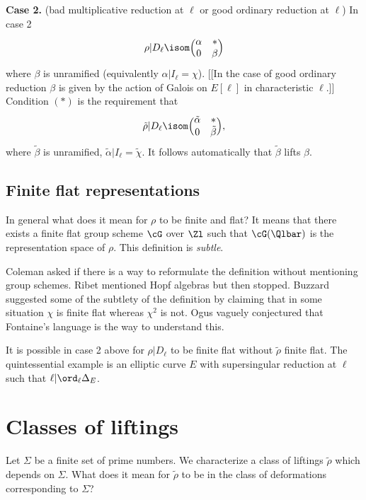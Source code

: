 \documentclass{report}
\begin{document}
{\bfseries Case 2.} (bad multiplicative reduction at $\ell$ or good
ordinary reduction at $\ell$) In case 2
$$\rho|D_{\ell}\isom
    \Bigl(\begin{matrix}\alpha&*\\0&\beta\end{matrix}\Bigr)$$
where $\beta$ is unramified (equivalently $\alpha|I_{\ell}=\chi$).
[[In the case of good ordinary reduction $\beta$ is given by the action
of Galois on $E[\ell]$ in characteristic $\ell$.]]
Condition $(*)$ is the requirement that
$$\tilde{\rho}|D_{\ell}\isom
    \Bigl(\begin{matrix}\tilde{\alpha}&*\\0&\tilde{\beta}\end{matrix}\Bigr),$$
where $\tilde{\beta}$ is unramified, $\tilde{\alpha}|I_{\ell}=\tilde{\chi}$.
It follows automatically that $\tilde{\beta}$ lifts $\beta$.

\subsection{Finite flat representations}
In general what does it mean for $\rho$ to be finite and flat?
It means that there exists a finite flat group scheme $\cG$ over
$\Zl$ such that $\cG(\Qlbar)$ is the representation space of $\rho$.
This definition is {\em subtle}.

Coleman asked if there is
a way to reformulate the definition without mentioning group schemes.
Ribet mentioned Hopf algebras but then stopped.
Buzzard suggested some of the subtlety of the definition by claiming that
in some situation $\chi$ is finite flat whereas $\chi^2$ is not.
Ogus vaguely conjectured that Fontaine's language is the way to
understand this.

It is possible in case 2 above for $\rho|D_{\ell}$ to be finite flat
without $\tilde{\rho}$ finite flat. The quintessential example is an
elliptic curve $E$ with supersingular reduction at $\ell$
such that $\ell|\ord_{\ell}\Delta_E$.

\section{Classes of liftings}
Let $\Sigma$ be a finite set of prime numbers. We characterize a
class of liftings $\tilde{\rho}$ which depends on $\Sigma$.
What does it mean for $\tilde{\rho}$ to be in the class of deformations
corresponding to $\Sigma$?
\end{document}

